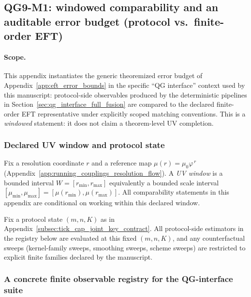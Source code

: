 \subsection{QG9-M1: windowed comparability and an auditable error budget (protocol vs.\ finite-order EFT)}
\label{app:qg9_m1_windowed_comparability}

\paragraph{Scope.}
\AuditTag This appendix instantiates the generic theoremized error budget of Appendix~\ref{app:eft_error_bounds} in the specific
``QG interface'' context used by this manuscript:
protocol-side observables produced by the deterministic pipelines in Section~\ref{sec:qg_interface_full_fusion}
are compared to the declared finite-order EFT representative under explicitly scoped matching conventions.
This is a \emph{windowed} statement: it does not claim a theorem-level UV completion.

\subsubsection{Declared UV window and protocol state}
\label{subsec:qg9_m1_window_state}

\begin{definition}\label{def:qg9_uv_window}
\InterfaceTag Fix a resolution coordinate $r$ and a reference map $\mu(r)=\mu_0\varphi^{\,r}$ (Appendix~\ref{app:running_couplings_resolution_flow}).
A \emph{UV window} is a bounded interval
$
W=[r_{\min},r_{\max}]
$
equivalently a bounded scale interval
$
[\mu_{\min},\mu_{\max}]=[\mu(r_{\min}),\mu(r_{\max})].
$
All comparability statements in this appendix are conditional on working within this declared window.
\end{definition}

\begin{definition}\label{def:qg9_protocol_state}
\InterfaceTag Fix a protocol state $(m,n,K)$ as in Appendix~\ref{subsec:tick_cap_joint_key_contract}.
All protocol-side estimators in the registry below are evaluated at this fixed $(m,n,K)$, and any counterfactual sweeps
(kernel-family sweeps, smoothing sweeps, scheme sweeps) are restricted to explicit finite families declared by the manuscript.
\end{definition}

\subsubsection{A concrete finite observable registry for the QG-interface suite}
\label{subsec:qg9_m1_registry}

